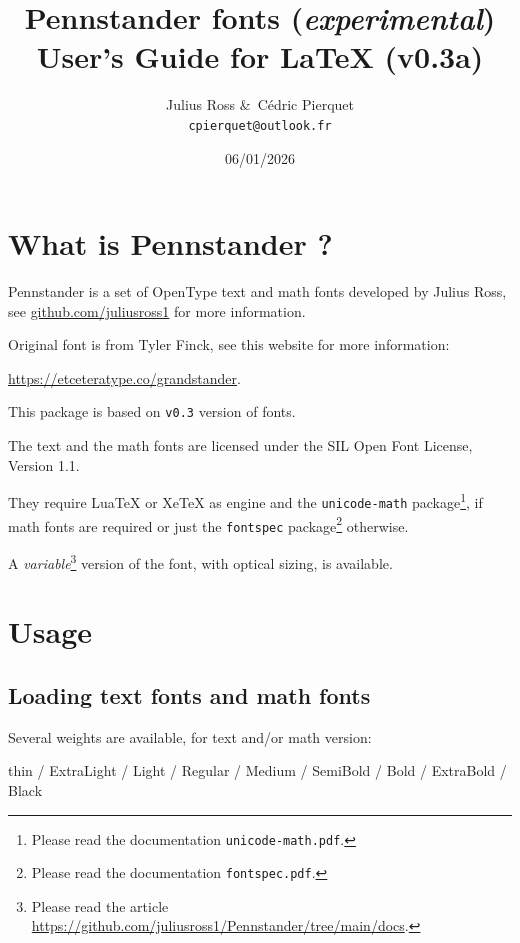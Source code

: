 \documentclass[a4paper]{scrartcl}
\title{Pennstander fonts (\textit{experimental}) \\User’s Guide for LaTeX (v0.3a)}
\author{Julius Ross \&\ Cédric Pierquet \\ \texttt{cpierquet@outlook.fr}}
\date{06/01/2026}
\newcommand*{\pkg}[1]{\texttt{#1}}
\newcommand*{\file}[1]{\texttt{#1}}
\begin{document}
\maketitle

\bigskip

\section{What is Pennstander ?}

Pennstander is a set of OpenType text and math fonts developed by Julius Ross, see \url{github.com/juliusross1} for more information.


Original font is from Tyler Finck, see this website for more information:

\url{https://etceteratype.co/grandstander}.

\smallskip

This package is based on \texttt{v0.3} version of fonts.

The text and the math fonts are licensed under the SIL Open Font License, Version 1.1.

They require LuaTeX or XeTeX as engine and the \pkg{unicode-math} package\footnote{Please read the documentation \file{unicode-math.pdf}.}, if math fonts are required or just the \pkg{fontspec} package\footnote{Please read the documentation \file{fontspec.pdf}.} otherwise.

\smallskip

A \textit{variable}\footnote{Please read the article \url{https://github.com/juliusross1/Pennstander/tree/main/docs}.} version of the font, with optical sizing, is available.

\pagebreak

\section{Usage}

\subsection{Loading text fonts and math fonts}

Several weights are available, for text and/or math version:

{\small \hfill{\pennstanderthin thin} / {\pennstanderextralight ExtraLight} / {\pennstanderlight Light} / {\pennstander Regular} / {\pennstandermedium Medium} / {\pennstandersemibold SemiBold} / {\pennstanderbold Bold} / {\pennstanderextrabold ExtraBold} / {\pennstanderblack Black}\hfill\null}
\end{document}
